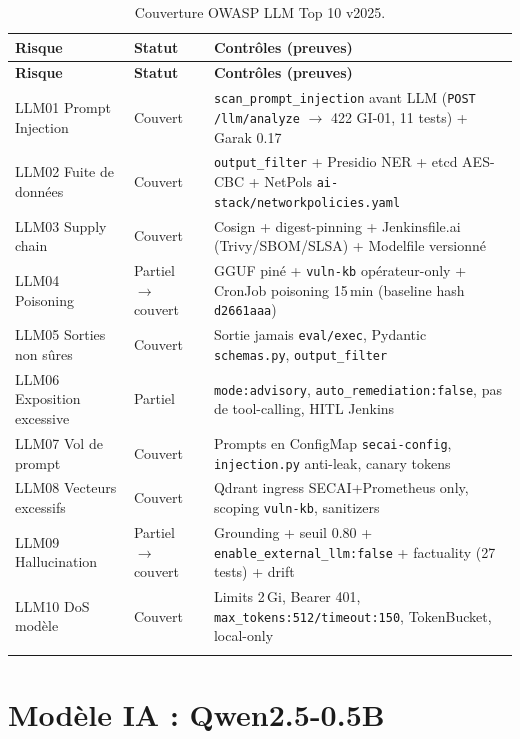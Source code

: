 \documentclass[12pt,a4paper,openany]{report}
\begin{document}
\begin{longtable}{@{}lll@{}}
\toprule
\textbf{Risque} & \textbf{Statut} & \textbf{Contrôles (preuves)} \\
\midrule
\endfirsthead
\toprule
\textbf{Risque} & \textbf{Statut} & \textbf{Contrôles (preuves)} \\
\midrule
\endhead
LLM01 Prompt Injection & Couvert & \texttt{scan\_prompt\_injection} avant LLM (\texttt{POST /llm/analyze} $\rightarrow$ 422 GI-01, 11 tests) + Garak 0.17 \\
LLM02 Fuite de données & Couvert & \texttt{output\_filter} + Presidio NER + etcd AES-CBC + NetPols \texttt{ai-stack/networkpolicies.yaml} \\
LLM03 Supply chain & Couvert & Cosign + digest-pinning + Jenkinsfile.ai (Trivy/SBOM/SLSA) + Modelfile versionné \\
LLM04 Poisoning & Partiel $\rightarrow$ couvert & GGUF piné + \texttt{vuln-kb} opérateur-only + CronJob poisoning 15\,min (baseline hash \texttt{d2661aaa}) \\
LLM05 Sorties non sûres & Couvert & Sortie jamais \texttt{eval/exec}, Pydantic \texttt{schemas.py}, \texttt{output\_filter} \\
LLM06 Exposition excessive & Partiel & \texttt{mode:advisory}, \texttt{auto\_remediation:false}, pas de tool-calling, HITL Jenkins \\
LLM07 Vol de prompt & Couvert & Prompts en ConfigMap \texttt{secai-config}, \texttt{injection.py} anti-leak, canary tokens \\
LLM08 Vecteurs excessifs & Couvert & Qdrant ingress SECAI+Prometheus only, scoping \texttt{vuln-kb}, sanitizers \\
LLM09 Hallucination & Partiel $\rightarrow$ couvert & Grounding + seuil 0.80 + \texttt{enable\_external\_llm:false} + factuality (27 tests) + drift \\
LLM10 DoS modèle & Couvert & Limits 2\,Gi, Bearer 401, \texttt{max\_tokens:512/timeout:150}, TokenBucket, local-only \\
\bottomrule
\caption{Couverture OWASP LLM Top 10 v2025.}
\label{tab:owasp-llm}
\end{longtable}

\section{Modèle IA : Qwen2.5-0.5B}
\end{document}
